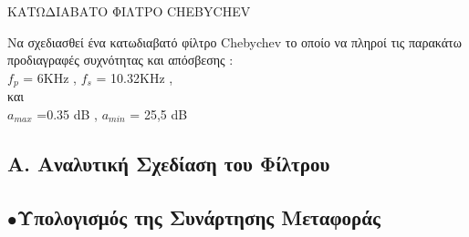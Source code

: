 \documentclass{article}
\begin{document}
\begin{center}
ΚΑΤΩΔΙΑΒΑΤΟ ΦΙΛΤΡΟ CHEBYCHEV
\end{center}
\large{}
Να σχεδιασθεί ένα κατωδιαβατό φίλτρο Chebychev το οποίο να πληροί τις παρακάτω προδιαγραφές συχνότητας και απόσβεσης : \\[0.4\baselineskip]
$f_p$ = 6KHz    ,      $f_s$ = 10.32KHz  , \\[0.4\baselineskip]
και \\[0.4\baselineskip]
$a_{max}$ =0.35 dB   ,     $a_{min}$ = 25,5 dB 
\subsection*{A. Αναλυτική Σχεδίαση του Φίλτρου}
 
  \subsection*{$\bullet$Υπολογισμός της Συνάρτησης Μεταφοράς}
 
\end{document}

